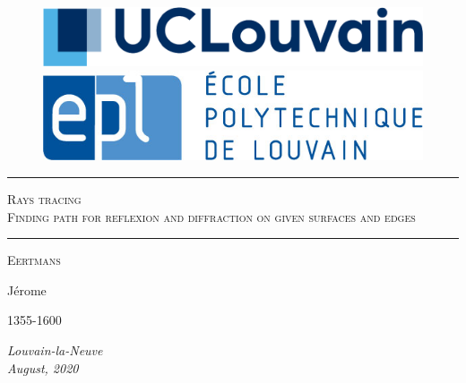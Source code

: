 \thispagestyle{empty}
\begin{figure}[H]
    \begin{minipage}[c]{.46\linewidth}
        \includegraphics[scale=0.7]{UCL-2.png}
    \end{minipage}
    \hfill%
    \begin{minipage}[c]{.46\linewidth}
    \flushright
        \includegraphics[scale=0.3]{EPL-3.jpg}
    \end{minipage}
\end{figure}

\vspace{1.6cm}
\noindent
\rule{\linewidth}{.5pt}
\begin{center}

\huge \textsc{Rays tracing} \vspace{1cm}
\\
\huge \textsc{Finding path for reflexion and diffraction on given surfaces and edges} \\
\rule{\linewidth}{.4pt}
\end{center}

\vspace{0.5cm}
{\large \begin{multicols}{3}
     \begin{flushright} \textsc{Eertmans}
     \end{flushright}
     \begin{center}
     Jérome
     \end{center}
     \begin{flushleft}
    1355-1600
     \end{flushleft}
     \end{multicols} \par}
\vfill

\vfill
\begin{center}
    \textit{Louvain-la-Neuve}\\
    \textit{August, 2020}
\end{center}
